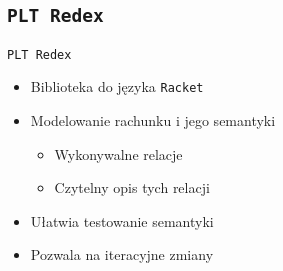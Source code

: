 \documentclass{beamer}
\newcommand{\Redex}{\texttt{PLT Redex}}
\newcommand{\Racket}{\texttt{Racket}}
\begin{document}
\subsection{\Redex}
\begin{frame}{\Redex}
  \begin{itemize}
    \item Biblioteka do języka \Racket
    \item Modelowanie rachunku i jego semantyki
    \begin{itemize}
      \item Wykonywalne relacje
      \item Czytelny opis tych relacji
    \end{itemize}
    \item Ułatwia testowanie semantyki
    \item Pozwala na iteracyjne zmiany    
  \end{itemize}
\end{frame}


\end{document}

